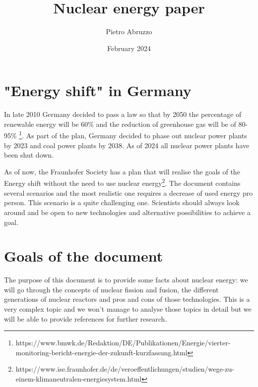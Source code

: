 \documentclass{article}
\title{Nuclear energy paper}
\author{Pietro Abruzzo}
\date{February 2024}
\begin{document}
\maketitle

\section{"Energy shift" in Germany}
In late 2010 Germany decided to pass a law so that by 2050 the percentage of renewable energy will be 60\% and the reduction of greenhouse gas will be of 80-95\% \footnote{https://www.bmwk.de/Redaktion/DE/Publikationen/Energie/vierter-monitoring-bericht-energie-der-zukunft-kurzfassung.html}.
As part of the plan, Germany decided to phase out nuclear power plants by 2023 and coal power plants by 2038. As of 2024 all nuclear power plants have been shut down.

As of now, the Fraunhofer Society has a plan that will realise the goals of the Energy shift without the need to use nuclear energy\footnote{https://www.ise.fraunhofer.de/de/veroeffentlichungen/studien/wege-zu-einem-klimaneutralen-energiesystem.html}. The document contains several scenarios and the most realistic one requires a decrease of used energy pro person. This scenario is a quite challenging one. Scientists should always look around and be open to new technologies and alternative possibilities to achieve a goal.

\section{Goals of the document}
The purpose of this document is to provide some facts about nuclear energy: we will go through the concepts of nuclear fission and fusion, the different generations of nuclear reactors and pros and cons of those technologies. This is a very complex topic and we won't manage to analyse those topics in detail but we will be able to provide references for further research.
\end{document}
